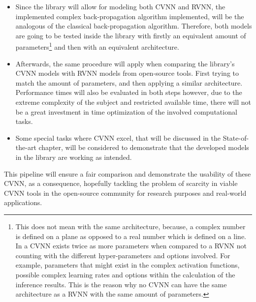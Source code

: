 \begin{itemize}
    \item Since the library will allow for modeling both \gls{CVNN} and \gls{RVNN}, the implemented complex back-propagation algorithm implemented, will be the analogous of the classical back-propagation algorithm. Therefore, both models are going to be tested inside the library with firstly an equivalent amount of parameters\footnote{This does not mean with the same architecture, because, a complex number is defined on a plane as opposed to a real number which is defined on a line. In a \gls{CVNN} exists twice as more parameters when compared to a \gls{RVNN} not counting with the different hyper-parameters and options involved. For example, parameters that might exist in the complex activation functions, possible complex learning rates and options within the calculation of the inference results. This is the reason why no \gls{CVNN} can have the same architecture as a \gls{RVNN} with the same amount of parameters.} and then with an equivalent architecture.
    \item Afterwards, the same procedure will apply when comparing the library's \gls{CVNN} models with \gls{RVNN} models from open-source tools. First trying to match the amount of parameters, and then applying a similar architecture. Performance times will also be evaluated in both steps however, due to the extreme complexity of the subject and restricted available time, there will not be a great investment in time optimization of the involved computational tasks.
    \item Some special tasks where \gls{CVNN} excel, that will be discussed in the State-of-the-art chapter, will be considered to demonstrate that the developed models in the library are working as intended.
\end{itemize}

This pipeline will ensure a fair comparison and demonstrate the usability of these \gls{CVNN}, as a consequence, hopefully tackling the problem of scarcity in viable \gls{CVNN} tools in the open-source community for research purposes and real-world applications.
